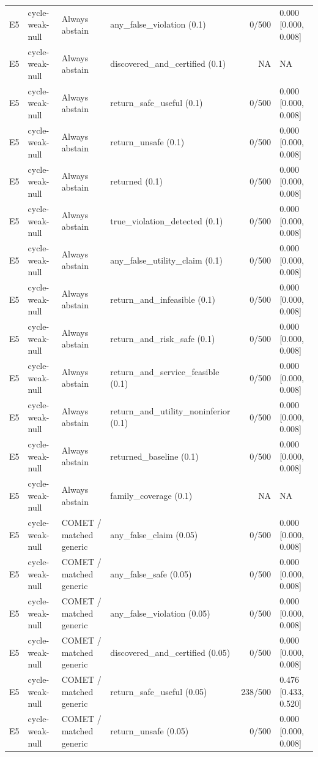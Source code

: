\begin{longtable}{p{.04\linewidth}p{.18\linewidth}p{.19\linewidth}p{.16\linewidth}r p{.21\linewidth}}
E5 & cycle-weak-null & Always abstain & any\_false\_violation (0.1) & 0/500 & 0.000 [0.000, 0.008]\\
E5 & cycle-weak-null & Always abstain & discovered\_and\_certified (0.1) & NA & NA\\
E5 & cycle-weak-null & Always abstain & return\_safe\_useful (0.1) & 0/500 & 0.000 [0.000, 0.008]\\
E5 & cycle-weak-null & Always abstain & return\_unsafe (0.1) & 0/500 & 0.000 [0.000, 0.008]\\
E5 & cycle-weak-null & Always abstain & returned (0.1) & 0/500 & 0.000 [0.000, 0.008]\\
E5 & cycle-weak-null & Always abstain & true\_violation\_detected (0.1) & 0/500 & 0.000 [0.000, 0.008]\\
E5 & cycle-weak-null & Always abstain & any\_false\_utility\_claim (0.1) & 0/500 & 0.000 [0.000, 0.008]\\
E5 & cycle-weak-null & Always abstain & return\_and\_infeasible (0.1) & 0/500 & 0.000 [0.000, 0.008]\\
E5 & cycle-weak-null & Always abstain & return\_and\_risk\_safe (0.1) & 0/500 & 0.000 [0.000, 0.008]\\
E5 & cycle-weak-null & Always abstain & return\_and\_service\_feasible (0.1) & 0/500 & 0.000 [0.000, 0.008]\\
E5 & cycle-weak-null & Always abstain & return\_and\_utility\_noninferior (0.1) & 0/500 & 0.000 [0.000, 0.008]\\
E5 & cycle-weak-null & Always abstain & returned\_baseline (0.1) & 0/500 & 0.000 [0.000, 0.008]\\
E5 & cycle-weak-null & Always abstain & family\_coverage (0.1) & NA & NA\\
E5 & cycle-weak-null & COMET / matched generic & any\_false\_claim (0.05) & 0/500 & 0.000 [0.000, 0.008]\\
E5 & cycle-weak-null & COMET / matched generic & any\_false\_safe (0.05) & 0/500 & 0.000 [0.000, 0.008]\\
E5 & cycle-weak-null & COMET / matched generic & any\_false\_violation (0.05) & 0/500 & 0.000 [0.000, 0.008]\\
E5 & cycle-weak-null & COMET / matched generic & discovered\_and\_certified (0.05) & 0/500 & 0.000 [0.000, 0.008]\\
E5 & cycle-weak-null & COMET / matched generic & return\_safe\_useful (0.05) & 238/500 & 0.476 [0.433, 0.520]\\
E5 & cycle-weak-null & COMET / matched generic & return\_unsafe (0.05) & 0/500 & 0.000 [0.000, 0.008]\\

\end{longtable}

